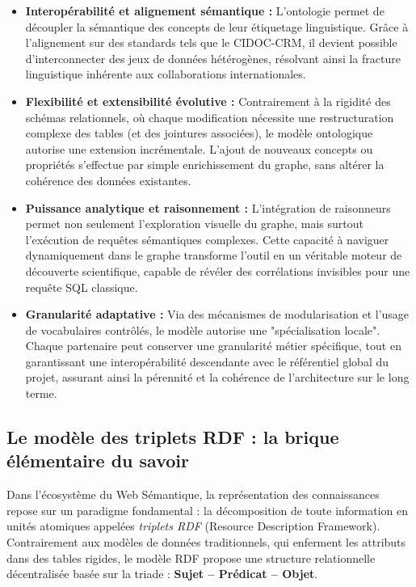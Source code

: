 \documentclass{article}
\begin{document}
\begin{itemize}
    \item \textbf{Interopérabilité et alignement sémantique :} L'ontologie permet de découpler la sémantique des concepts de leur étiquetage linguistique. Grâce à l'alignement sur des standards tels que le CIDOC-CRM, il devient possible d'interconnecter des jeux de données hétérogènes, résolvant ainsi la fracture linguistique inhérente aux collaborations internationales.
    \item \textbf{Flexibilité et extensibilité évolutive :} Contrairement à la rigidité des schémas relationnels, où chaque modification nécessite une restructuration complexe des tables (et des jointures associées), le modèle ontologique autorise une extension incrémentale. L'ajout de nouveaux concepts ou propriétés s'effectue par simple enrichissement du graphe, sans altérer la cohérence des données existantes.
    \item \textbf{Puissance analytique et raisonnement :} L'intégration de raisonneurs permet non seulement l'exploration visuelle du graphe, mais surtout l'exécution de requêtes sémantiques complexes. Cette capacité à naviguer dynamiquement dans le graphe transforme l'outil en un véritable moteur de découverte scientifique, capable de révéler des corrélations invisibles pour une requête SQL classique.
    \item \textbf{Granularité adaptative :} Via des mécanismes de modularisation et l'usage de vocabulaires contrôlés, le modèle autorise une "spécialisation locale". Chaque partenaire peut conserver une granularité métier spécifique, tout en garantissant une interopérabilité descendante avec le référentiel global du projet, assurant ainsi la pérennité et la cohérence de l'architecture sur le long terme.
\end{itemize}

\subsection{Le modèle des triplets RDF : la brique élémentaire du savoir}

Dans l'écosystème du Web Sémantique, la représentation des connaissances repose sur un paradigme fondamental : la décomposition de toute information en unités atomiques appelées \textit{triplets RDF} (Resource Description Framework). Contrairement aux modèles de données traditionnels, qui enferment les attributs dans des tables rigides, le modèle RDF propose une structure relationnelle décentralisée basée sur la triade : \textbf{Sujet – Prédicat – Objet}.
\end{document}
